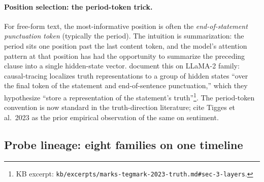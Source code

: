 \paragraph{Position selection: the period-token trick.} For free-form
text, the most-informative  position is often the
\emph{end-of-statement punctuation token} (typically the period). The
intuition is summarization: the period sits one position past the last
content token, and the model's attention pattern at that position has had
the opportunity to summarize the preceding clause into a single
hidden-state vector. \citet[\S 3]{marks-tegmark-2023-truth} document this
on LLaMA-2 family: causal-tracing localizes truth representations to a
group of hidden states ``over the final token of the statement and
end-of-sentence punctuation,'' which they hypothesize ``store a
representation of the statement's truth''\footnote{KB excerpt:
\nolinkurl{kb/excerpts/marks-tegmark-2023-truth.md#sec-3-layers}.}. The
period-token convention is now standard in the truth-direction
literature; \citet{marks-tegmark-2023-truth} cite Tigges et al.\ 2023 as
the prior empirical observation of the same  on
sentiment.

\subsection{Probe lineage: eight families on one timeline}
\label{sec:probe-lineage}

